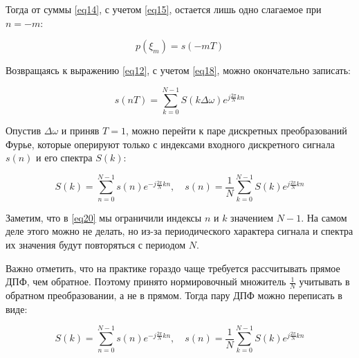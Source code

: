 Тогда от суммы \eqref{eq14}, с учетом \eqref{eq15}, остается лишь одно слагаемое при \( n = -m \):

\begin{equation}
\label{eq18}
p(\xi_m) = s(-mT)
\end{equation}

Возвращаясь к выражению \eqref{eq12}, с учетом \eqref{eq18}, можно окончательно записать:

\begin{equation}
\label{eq19}
s(nT) = \sum_{k=0}^{N-1} S(k \Delta \omega) e^{j\frac{2\pi}{N}kn} \tag{2.15}
\end{equation}

Опустив \( \Delta \omega \) и приняв \( T = 1 \), можно перейти к паре дискретных преобразований Фурье, которые оперируют только с индексами входного дискретного сигнала \( s(n) \) и его спектра \( S(k) \):

\begin{equation}
\label{eq20}
S(k) = \sum_{n=0}^{N-1} s(n) e^{-j\frac{2\pi}{N}kn}, \quad \tag{2.16}
s(n) = \frac{1}{N} \sum_{k=0}^{N-1} S(k) e^{j\frac{2\pi}{N}kn} \tag{2.17}
\end{equation}

Заметим, что в \eqref{eq20} мы ограничили индексы \( n \) и \( k \) значением \( N-1 \). На самом деле этого можно не делать, но из-за периодического характера сигнала и спектра их значения будут повторяться с периодом \( N \).

Важно отметить, что на практике гораздо чаще требуется рассчитывать прямое ДПФ, чем обратное. Поэтому принято нормировочный множитель \( \frac{1}{N} \) учитывать в обратном преобразовании, а не в прямом. Тогда пару ДПФ можно переписать в виде:

\begin{equation}
\label{eq21}
S(k) = \sum_{n=0}^{N-1} s(n) e^{-j\frac{2\pi}{N}kn}, \quad \tag{2.18}
s(n) = \frac{1}{N} \sum_{k=0}^{N-1} S(k) e^{j\frac{2\pi}{N}kn} \tag{2.19}
\end{equation}

